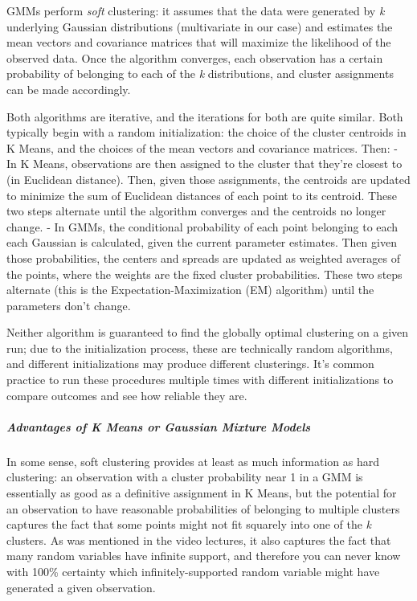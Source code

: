\documentclass{article}
\begin{document}
GMMs perform \emph{soft} clustering: it assumes that the data were
generated by \emph{k} underlying Gaussian distributions (multivariate in
our case) and estimates the mean vectors and covariance matrices that
will maximize the likelihood of the observed data. Once the algorithm
converges, each observation has a certain probability of belonging to
each of the \emph{k} distributions, and cluster assignments can be made
accordingly.

Both algorithms are iterative, and the iterations for both are quite
similar. Both typically begin with a random initialization: the choice
of the cluster centroids in K Means, and the choices of the mean vectors
and covariance matrices. Then: - In K Means, observations are then
assigned to the cluster that they're closest to (in Euclidean distance).
Then, given those assignments, the centroids are updated to minimize the
sum of Euclidean distances of each point to its centroid. These two
steps alternate until the algorithm converges and the centroids no
longer change. - In GMMs, the conditional probability of each point
belonging to each each Gaussian is calculated, given the current
parameter estimates. Then given those probabilities, the centers and
spreads are updated as weighted averages of the points, where the
weights are the fixed cluster probabilities. These two steps alternate
(this is the Expectation-Maximization (EM) algorithm) until the
parameters don't change.

Neither algorithm is guaranteed to find the globally optimal clustering
on a given run; due to the initialization process, these are technically
random algorithms, and different initializations may produce different
clusterings. It's common practice to run these procedures multiple times
with different initializations to compare outcomes and see how reliable
they are.

\subparagraph{Advantages of K Means or Gaussian Mixture
Models}\label{advantages-of-k-means-or-gaussian-mixture-models}

In some sense, soft clustering provides at least as much information as
hard clustering: an observation with a cluster probability near 1 in a
GMM is essentially as good as a definitive assignment in K Means, but
the potential for an observation to have reasonable probabilities of
belonging to multiple clusters captures the fact that some points might
not fit squarely into one of the \emph{k} clusters. As was mentioned in
the video lectures, it also captures the fact that many random variables
have infinite support, and therefore you can never know with 100\%
certainty which infinitely-supported random variable might have
generated a given observation.
\end{document}
